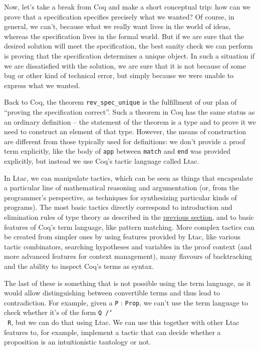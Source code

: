 \documentclass[declaration,mgr,english,shortabstract]{iithesis}
\newcommand{\m}[1]{\texttt{#1}}
\begin{document}
Now, let's take a break from Coq and make a short conceptual trip: how can we prove that a specification specifies precisely what we wanted? Of course, in general, we can't, because what we really want lives in the world of ideas, whereas the specification lives in the formal world. But if we are sure that the desired solution will meet the specification, the best sanity check we can perform is proving that the specification determines a unique object.
In such a situation if we are dissatisfied with the solution, we are sure that it is not because of some bug or other kind of technical error, but simply because we were unable to express what we wanted.

Back to Coq, the theorem \m{rev\_spec\_unique} is the fulfillment of our plan of ``proving the specification correct''. Such a theorem in Coq has the same status as an ordinary definition -- the statement of the theorem is a type and to prove it we need to construct an element of that type. However, the means of construction are different from those typically used for definitions: we don't provide a proof term explicitly, like the body of \m{app} between \m{match} and \m{end} was provided explicitly, but instead we use Coq's tactic language called Ltac.

In Ltac, we can manipulate tactics, which can be seen as things that encapsulate a particular line of mathematical reasoning and argumentation (or, from the programmer's perspective, as techniques for synthesizing particular kinds of programs). The most basic tactics directly correspond to introduction and elimination rules of type theory as described in the \hyperref[mltt]{previous section}, and to basic features of Coq's term language, like pattern matching. More complex tactics can be created from simpler ones by using features provided by Ltac, like various tactic combinators, searching hypotheses and variables in the proof context (and more advanced features for context management), many flavours of backtracking and the ability to inspect Coq's terms as syntax.

The last of these is something that is not possible using the term language, as it would allow distinguishing between convertible terms and thus lead to contradiction. For example, given a \m{P} : \m{Prop}, we can't use the term language to check whether it's of the form \m{Q /\char`\\\ R}, but we can do that using Ltac. We can use this together with other Ltac features to, for example, implement a tactic that can decide whether a proposition is an intuitionistic tautology or not.
\end{document}
